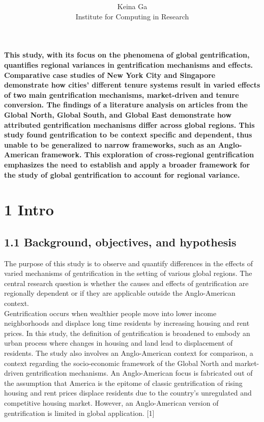 \documentclass[12pt]{article}
\date{}
\title{\bfseries \boldmath \scititle}
\author{Keina Ga\\Institute for Computing in Research}
\renewenvironment{abstract}
	{\quotation}
	{\endquotation}
\begin{document}
 

\maketitle

\begin{abstract} \bfseries \boldmath
This study, with its focus on the phenomena of global gentrification, quantifies regional variances in gentrification mechanisms and effects. Comparative case studies of New York City and Singapore demonstrate how cities’ different tenure systems result in varied effects of two main gentrification mechanisms, market-driven and tenure conversion. The findings of a literature analysis on articles from the Global North, Global South, and Global East demonstrate how attributed gentrification mechanisms differ across global regions. This study found gentrification to be context specific and dependent, thus unable to be generalized to narrow frameworks, such as an Anglo-American framework. This exploration of cross-regional gentrification emphasizes the need to establish and apply a broader framework for the study of global gentrification to account for regional variance.
\end{abstract}

\section*{1 Intro}
\subsection*{1.1 Background, objectives, and hypothesis} 
The purpose of this study is to observe and quantify differences in the effects of varied mechanisms of gentrification in the setting of various global regions. The central research question is whether the causes and effects of gentrification are regionally dependent or if they are applicable outside the Anglo-American context. \\

Gentrification occurs when wealthier people move into lower income neighborhoods and displace long time residents by increasing housing and rent prices. In this study, the definition of gentrification is broadened to embody an urban process where changes in housing and land lead to displacement of residents. The study also involves an Anglo-American context for comparison, a context regarding the socio-economic framework of the Global North and market-driven gentrification mechanisms. An Anglo-American focus is fabricated out of the assumption that America is the epitome of classic gentrification of rising housing and rent prices displace residents due to the country’s unregulated and competitive housing market. However, an Anglo-American version of gentrification is limited in global application. [1] \\ 
\end{document}
